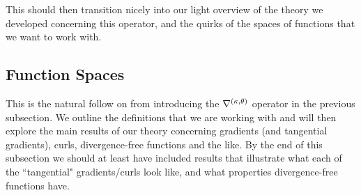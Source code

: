 This should then transition nicely into our light overview of the theory we developed concerning this operator, and the quirks of the spaces of functions that we want to work with.

\subsection{Function Spaces} \label{ssec:FunctionSpaces}
This is the natural follow on from introducing the $\nabla^{\left( \kappa, \theta \right)}$ operator in the previous subsection.
We outline the definitions that we are working with and will then explore the main results of our theory concerning gradients (and tangential gradients), curls, divergence-free functions and the like.
By the end of this subsection we should at least have included results that illustrate what each of the ``tangential" gradients/curls look like, and what properties divergence-free functions have.

